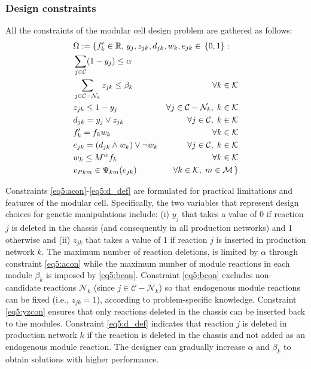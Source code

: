\subsubsection{Design constraints} \label{sec:problem_constraints}
All the constraints of the modular cell design problem are gathered as follows:
\begin{alignat}{2}
& \mathrlap{	 \Omega:=\{f'_k \in \mathbb{R}, \, y_j, z_{jk}, d_{jk}, w_{k}, e_{jk} \in \, \{0,1\} : }\\ %
& \sum_{j\in \mathcal{C}} (1-y_j)\le \alpha 						\label{eq5:acon}\\
& \sum_{j\in \mathcal{C} - \mathcal{N}_k }z_{jk} \le \beta_k & \forall k\in \mathcal{K} 	\label{eq5:bcon}\\
& z_{jk}\le 1-y_j  & \forall j\in \mathcal{C} - \mathcal{N}_k , \;  k\in \mathcal{K}	\label{eq5:yzcon}\\
& d_{jk} = y_j \lor z_{jk} & \forall j \in \mathcal{C} ,\;  k \in \mathcal{K} \label{eq5:d_def}\\
& f'_k = f_k w_k & \forall k \in \mathcal{K} \label{eq5:fprime}\\
& e_{jk} = (d_{jk} \land w_k) \lor \lnot w_k & \forall j \in \mathcal{C} ,\;  k \in \mathcal{K} \label{eq5:e_def} \\
& w_k \le M^w f_k & \forall k \in \mathcal{K} \label{eq5:w_symmetry}\\
& v_{Pkm} \in \Psi_{km}(e_{jk})  & \forall k \in \mathcal{K} ,\;  m \in \mathcal{M} \label{eq5:psi} \, \}
\end{alignat}

\noindent Constraints \eqref{eq5:acon}-\eqref{eq5:d_def} are formulated for practical limitations and features of the modular cell. Specifically, the two variables that represent design choices for genetic manipulations include: (i) $y_j$ that takes a value of 0 if reaction $j$ is deleted in the chassis (and consequently in all production networks) and 1 otherwise and (ii) $z_{jk}$ that takes a value of 1 if reaction $j$ is inserted in production network $k$. The maximum number of reaction deletions, is limited by $\alpha$ through constraint \eqref{eq5:acon} while the maximum number of module reactions in each module $\beta_k$ is imposed by \eqref{eq5:bcon}. Constraint \eqref{eq5:bcon} excludes non-candidate reactions $\mathcal{N}_k$ (since $j\in \mathcal{C} - \mathcal{N}_k$)  so that endogenous module reactions can be fixed  (i.e., $z_{jk}=1$), according to problem-specific knowledge. Constraint \eqref{eq5:yzcon} ensures that only reactions deleted in the chassis can be inserted back to the modules.
Constraint \eqref{eq5:d_def} indicates that reaction $j$ is deleted in production network $k$ if the reaction is deleted in the chassis and not added as an endogenous module reaction. The designer can gradually increase $\alpha$ and $\beta_k$ to obtain solutions with higher performance.

